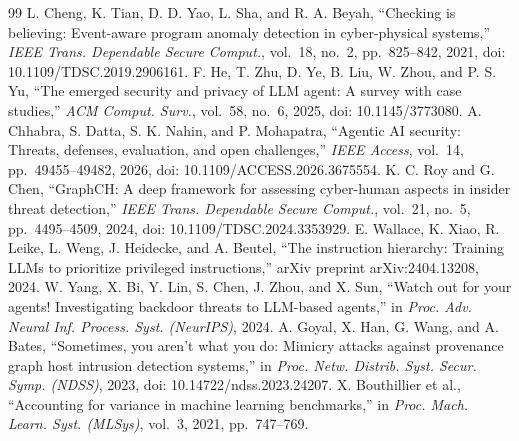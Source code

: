 \documentclass[journal]{IEEEtran}
\theoremstyle{remark}
\begin{document}
\begin{thebibliography}{99}
 L. Cheng, K. Tian, D. D. Yao, L. Sha, and R. A. Beyah, ``Checking is believing: Event-aware program anomaly detection in cyber-physical systems,'' \emph{IEEE Trans. Dependable Secure Comput.}, vol.~18, no.~2, pp.~825--842, 2021, doi: 10.1109/TDSC.2019.2906161.
 F. He, T. Zhu, D. Ye, B. Liu, W. Zhou, and P. S. Yu, ``The emerged security and privacy of LLM agent: A survey with case studies,'' \emph{ACM Comput. Surv.}, vol.~58, no.~6, 2025, doi: 10.1145/3773080.
 A. Chhabra, S. Datta, S. K. Nahin, and P. Mohapatra, ``Agentic AI security: Threats, defenses, evaluation, and open challenges,'' \emph{IEEE Access}, vol.~14, pp.~49455--49482, 2026, doi: 10.1109/ACCESS.2026.3675554.
 K. C. Roy and G. Chen, ``GraphCH: A deep framework for assessing cyber-human aspects in insider threat detection,'' \emph{IEEE Trans. Dependable Secure Comput.}, vol.~21, no.~5, pp.~4495--4509, 2024, doi: 10.1109/TDSC.2024.3353929.
 E. Wallace, K. Xiao, R. Leike, L. Weng, J. Heidecke, and A. Beutel, ``The instruction hierarchy: Training LLMs to prioritize privileged instructions,'' arXiv preprint arXiv:2404.13208, 2024.
 W. Yang, X. Bi, Y. Lin, S. Chen, J. Zhou, and X. Sun, ``Watch out for your agents! Investigating backdoor threats to LLM-based agents,'' in \emph{Proc. Adv. Neural Inf. Process. Syst. (NeurIPS)}, 2024.
 A. Goyal, X. Han, G. Wang, and A. Bates, ``Sometimes, you aren't what you do: Mimicry attacks against provenance graph host intrusion detection systems,'' in \emph{Proc. Netw. Distrib. Syst. Secur. Symp. (NDSS)}, 2023, doi: 10.14722/ndss.2023.24207.
 X. Bouthillier et al., ``Accounting for variance in machine learning benchmarks,'' in \emph{Proc. Mach. Learn. Syst. (MLSys)}, vol.~3, 2021, pp.~747--769.
\end{thebibliography}
\end{document}
